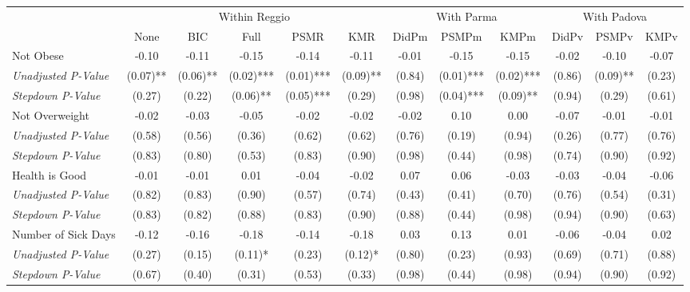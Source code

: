 \begin{tabular}{l c c c c c c c c c c c}
\toprule
& \multicolumn{5}{c}{Within Reggio} & \multicolumn{3}{c}{With Parma} & \multicolumn{3}{c}{With Padova} \\\cmidrule(lr){2-6} \cmidrule(lr){7-9} \cmidrule(lr){10-12}
 & None & BIC & Full & PSMR & KMR & DidPm & PSMPm & KMPm & DidPv & PSMPv & KMPv \\
\midrule
Not Obese & -0.10 & -0.11 & -0.15 & -0.14 & -0.11 & -0.01 & -0.15 & -0.15 & -0.02 & -0.10 & -0.07 \\
\quad \textit{Unadjusted P-Value} & (0.07)** & (0.06)** & (0.02)*** & (0.01)*** & (0.09)** & (0.84) & (0.01)*** & (0.02)*** & (0.86) & (0.09)** & (0.23) \\
\quad \textit{Stepdown P-Value} & (0.27) & (0.22) & (0.06)** & (0.05)*** & (0.29) & (0.98) & (0.04)*** & (0.09)** & (0.94) & (0.29) & (0.61) \\
Not Overweight & -0.02 & -0.03 & -0.05 & -0.02 & -0.02 & -0.02 & 0.10 & 0.00 & -0.07 & -0.01 & -0.01 \\
\quad \textit{Unadjusted P-Value} & (0.58) & (0.56) & (0.36) & (0.62) & (0.62) & (0.76) & (0.19) & (0.94) & (0.26) & (0.77) & (0.76) \\
\quad \textit{Stepdown P-Value} & (0.83) & (0.80) & (0.53) & (0.83) & (0.90) & (0.98) & (0.44) & (0.98) & (0.74) & (0.90) & (0.92) \\
Health is Good & -0.01 & -0.01 & 0.01 & -0.04 & -0.02 & 0.07 & 0.06 & -0.03 & -0.03 & -0.04 & -0.06 \\
\quad \textit{Unadjusted P-Value} & (0.82) & (0.83) & (0.90) & (0.57) & (0.74) & (0.43) & (0.41) & (0.70) & (0.76) & (0.54) & (0.31) \\
\quad \textit{Stepdown P-Value} & (0.83) & (0.82) & (0.88) & (0.83) & (0.90) & (0.88) & (0.44) & (0.98) & (0.94) & (0.90) & (0.63) \\
Number of Sick Days & -0.12 & -0.16 & -0.18 & -0.14 & -0.18 & 0.03 & 0.13 & 0.01 & -0.06 & -0.04 & 0.02 \\
\quad \textit{Unadjusted P-Value} & (0.27) & (0.15) & (0.11)* & (0.23) & (0.12)* & (0.80) & (0.23) & (0.93) & (0.69) & (0.71) & (0.88) \\
\quad \textit{Stepdown P-Value} & (0.67) & (0.40) & (0.31) & (0.53) & (0.33) & (0.98) & (0.44) & (0.98) & (0.94) & (0.90) & (0.92) \\
\bottomrule
\end{tabular}

